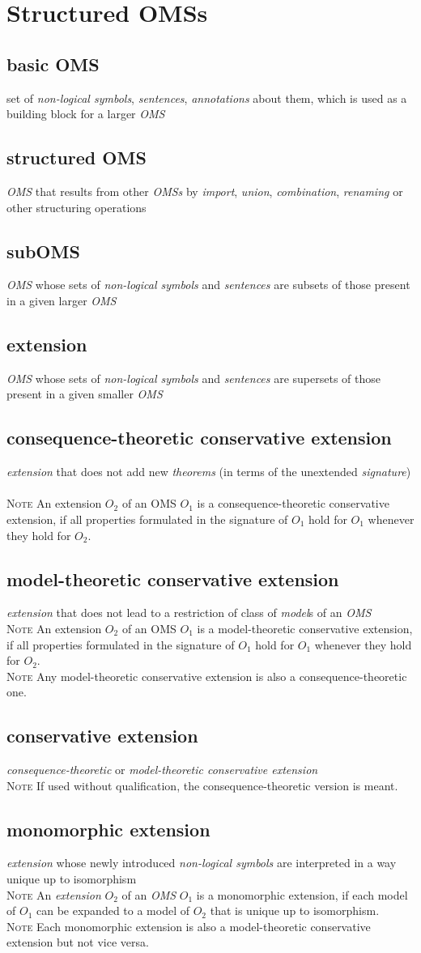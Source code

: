 \documentclass[10pt,%
\ifpretendfinal
final%
\else
draft%
\fi,
]{scrreprt}
\newcommand*{\termref}[1]{\textit{#1}}
\newcommand{\sclause}[1]{\section{#1}}
\newcommand{\termdefinition}[2]{\subsection*{#1}#2}
\newenvironment{definitions}[0]{\medskip }{}
\newenvironment{note}[0]{\ \\ \textsc{Note} \quad}{}
\begin{document}
\sclause{Structured OMSs}
\begin{definitions}
\termdefinition{basic OMS}{set of \termref{non-logical symbols}, \termref{sentences}, \termref{annotations} about them, which is used as a building block for a larger \termref{OMS}}

\termdefinition{structured OMS}
{\termref{OMS} that results from other \termref{OMSs} by \termref{import}, \termref{union}, \termref{combination}, \termref{renaming} or other structuring operations}

  \termdefinition{subOMS}{\termref{OMS} whose sets of \termref{non-logical symbols} and \termref{sentences} are subsets of those present in a given larger \termref{OMS}}

  \termdefinition{extension}{\termref{OMS} whose sets of \termref{non-logical symbols} and \termref{sentences} are supersets of those present in a given smaller \termref{OMS}}

  \termdefinition{consequence-theoretic conservative extension}{\termref{extension} that does
   not add new \termref{theorems} (in terms of the unextended \termref{signature})}
  \begin{note}
    An extension $O_2$ of an OMS $O_1$ is a consequence-theoretic conservative extension, if all properties formulated in the signature of $O_1$ hold for $O_1$ whenever they hold for $O_2$.
  \end{note}

  \termdefinition{model-theoretic conservative extension}{\termref{extension}
   that does not lead to a restriction of class of \termref{model}s of an \termref{OMS}}
  \begin{note}
    An extension $O_2$ of an OMS $O_1$ is a model-theoretic conservative extension, if all properties formulated in the signature of $O_1$ hold for $O_1$ whenever they hold for $O_2$.
  \end{note}
  \begin{note}
   Any model-theoretic conservative extension is also a consequence-theoretic one.
  \end{note}

  \termdefinition{conservative extension}{\termref{consequence-theoretic} or \termref{model-theoretic conservative extension}}
  \begin{note}
   If used without qualification, the consequence-theoretic version is meant.
  \end{note}

  \termdefinition{monomorphic extension}{\termref{extension} whose newly introduced
   \termref{non-logical symbols} are interpreted in a way unique up to isomorphism}
  \begin{note}
An \termref{extension} $O_2$ of an \termref{OMS} $O_1$ is a monomorphic extension, if each model of $O_1$ can be expanded to a model of $O_2$ that is unique up to isomorphism.
  \end{note}
  \begin{note}
    Each monomorphic extension is also a model-theoretic conservative extension but not vice versa.
  \end{note}


\end{definitions}
\end{document}
